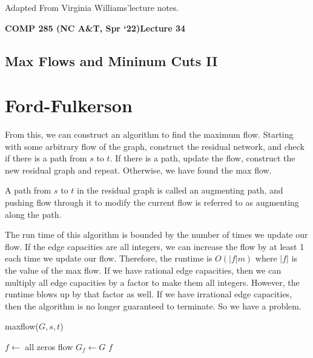 \documentclass [12pt]{article}
\theoremstyle{definition}
\begin{document}
 

\vspace {1em} 
\begin {Instruction} 
Adapted From Virginia Williams'lecture notes.
\end {Instruction}  

{\LARGE \textbf {COMP 285 (NC A\&T, Spr `22)}\hfill \textbf {Lecture 34} } 

\begin{centering}
\section*{Max Flows and Mininum Cuts II}
\end{centering}

\section{Ford-Fulkerson}
From this, we can construct an algorithm to find the maximum flow. Starting with some arbitrary flow of the graph, construct the residual network, and check if there is a path from $s$ to $t$. If there is a path, update the flow, construct the new residual graph and repeat. Otherwise, we have found the max flow. 

A path from $s$ to $t$ in the residual graph is called an augmenting path, and pushing flow through it to modify the current flow is referred to as augmenting along the path. 

The run time of this algorithm is bounded by the number of times we update our flow. If the edge capacities are all integers, we can increase the flow by at least 1 each time we update our flow. Therefore, the runtime is $O(|f |m)$ where $|f |$ is the value of the max flow. If we have rational edge capacities, then we can multiply all edge capacities by a factor to make them all integers. However, the runtime blows up by that factor as well. If we have irrational edge capacities, then the algorithm is no longer guaranteed to terminate. So we have a problem.

\begin{algorithm}
\caption{maxflow($G,s, t$)}
\label{alg:maxflow_algorithm}
\begin{algorithmic}
\State $f \gets$ all zeros flow
\State $G_f \gets G$
\State {}
\State \Return $f$
\end{algorithmic}
\end{algorithm}
 
\end{document}
